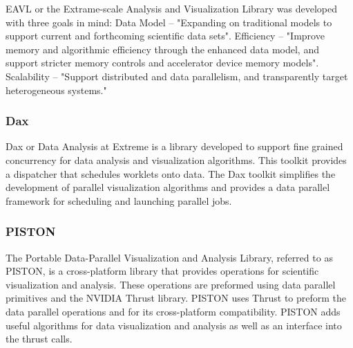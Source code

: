 EAVL or the Extrame-scale Analysis and Visualization Library was developed with three goals in mind: Data Model -- "Expanding on traditional models to support current and forthcoming scientific data sets". Efficiency -- "Improve memory and algorithmic efficiency through the enhanced data model, and support stricter memory controls and accelerator device memory models". Scalability -- "Support distributed and data parallelism, and transparently target heterogeneous systems."
~\cite{jeremyEAVL}

\subsubsection*{\textbf{Dax}}

Dax or Data Analysis at Extreme is a library developed to support fine grained concurrency for data analysis and visualization algorithms.
%
This toolkit provides a dispatcher that schedules worklets onto data.
%
The Dax toolkit simplifies the development of parallel visualization algorithms and provides a data parallel framework for scheduling and launching parallel jobs.
~\cite{morelanddax}
~\cite{moreland2011dax}

\subsubsection*{\textbf{PISTON}} 

The Portable Data-Parallel Visualization and Analysis Library, referred to as PISTON, is a cross-platform library that provides operations for scientific visualization and analysis.
%
These operations are preformed using data parallel primitives and the NVIDIA Thrust library.
%
PISTON uses Thrust to preform the data parallel operations and for its cross-platform compatibility.
%
PISTON adds useful algorithms for data visualization and analysis as well as an interface into the thrust calls.
~\cite{PISTON}

